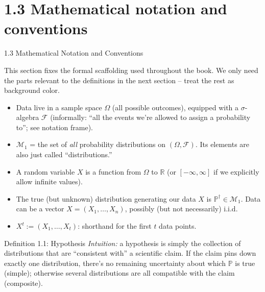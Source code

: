 \documentclass[aspectratio=169,10pt]{beamer}
\begin{document}
\section{1.3 Mathematical notation and conventions}

\begin{frame}[allowframebreaks]{1.3 Mathematical Notation and Conventions}

This section fixes the formal scaffolding used throughout the book. We
only need the parts relevant to the definitions in the next section --
treat the rest as background color.

\begin{itemize}
  \item Data live in a sample space $\Omega$ (all possible outcomes),
    equipped with a $\sigma$-algebra $\mathcal{F}$ (informally: ``all the
    events we're allowed to assign a probability to''; see notation frame).
  \item $\mathcal{M}_1$ = the set of \emph{all} probability distributions on
    $(\Omega,\mathcal{F})$. Its elements are also just called
    ``distributions.''
  \item A random variable $X$ is a function from $\Omega$ to $\mathbb{R}$
    (or $[-\infty,\infty]$ if we explicitly allow infinite values).
  \item The true (but unknown) distribution generating our data $X$ is
    $\mathbb{P}^{\dagger}\in\mathcal{M}_1$. Data can be a vector
    $X=(X_1,\dots,X_n)$, possibly (but not necessarily) i.i.d.
  \item $X^t := (X_1,\dots,X_t)$: shorthand for the first $t$ data points.
\end{itemize}

\framebreak

\begin{block}{Definition 1.1: Hypothesis}
\emph{Intuition:} a hypothesis is simply the collection of distributions
that are ``consistent with'' a scientific claim. If the claim pins down
exactly one distribution, there's no remaining uncertainty about which
$\mathbb{P}$ is true (simple); otherwise several distributions are all
compatible with the claim (composite).


\end{block}
\end{frame}
\end{document}
